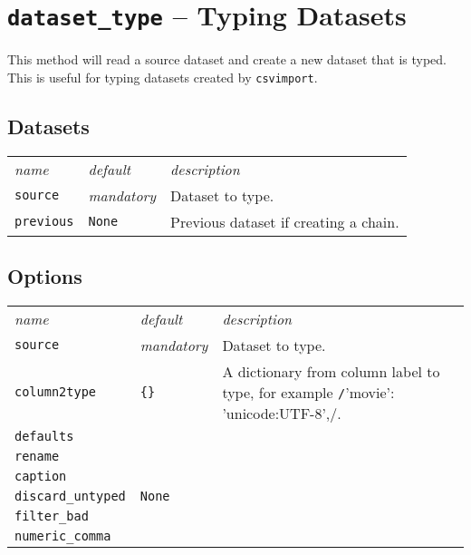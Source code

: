 \clearpage
\section{\texttt{dataset\_type} -- Typing Datasets}
This method will read a source dataset and create a new dataset that
is typed.  This is useful for typing datasets created by
\texttt{csvimport}.



\subsection{Datasets}
\begin{tabular}{ p{3.2cm} p{1.8cm} p{10cm}}
  \textsl{name} & \textsl{default} & \textsl{description}\\[2ex]

  \texttt{source} & \textsl{mandatory} & Dataset to type.\\[1ex]
  \texttt{previous} & \texttt{None} & Previous dataset if creating a chain.
\end{tabular}


\subsection{Options}
\begin{tabular}{ p{3.2cm} p{1.8cm} p{10cm}}
  \textsl{name} & \textsl{default} & \textsl{description}\\[2ex]

  \texttt{source} & \textsl{mandatory} & Dataset to type.\\[1ex]

  \texttt{column2type} & \texttt{\{\}} & A dictionary from column
  label to type, for example \texttt/{'movie': 'unicode:UTF-8',}/.\\[1ex]

  \texttt{defaults} & & \\[1ex]
  \texttt{rename} & & \\[1ex]
  \texttt{caption} & & \\[1ex]
  \texttt{discard\_untyped} & \texttt{None}& \\[1ex]
  \texttt{filter\_bad} & & \\[1ex]
  \texttt{numeric\_comma} & & \\[1ex]

\end{tabular}

